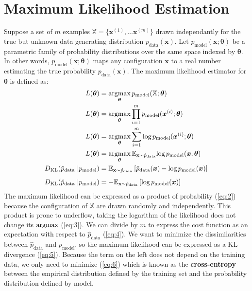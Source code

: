 \documentclass[12pt]{report}
\newcommand{\argmax}{\operatornamewithlimits{argmax}}
\begin{document}
        \section{Maximum Likelihood Estimation}
            Suppose a set of $m$ examples $\mathbb{X} = \{\boldsymbol{x}^{(1)}, \dots \boldsymbol{x}^{(m)}\}$ drawn independantly for the true but unknown data generating distribution $p_{\text{data}}(\boldsymbol{x})$.
            Let $p_{\text{model}}(\boldsymbol{\mathbf{x}};\boldsymbol{\theta})$ be a parametric family of probability distributions over the same space indexed by $\boldsymbol{\theta}$. In other words, $p_{\text{model}}(\boldsymbol{x};\boldsymbol{\theta})$ maps any configuration $\boldsymbol{x}$ to a real number estimating the true probability $p_{\text{data}}(\boldsymbol{x})$. The maximum likelihood estimator for $\boldsymbol{\theta}$ is defined as:
            \begin{align}
                L(\boldsymbol{\theta}) &= \argmax_{\boldsymbol{\theta}}p_{\text{model}}(\mathbb{X};\boldsymbol{\theta}) \label{eq:1}\\
                L(\boldsymbol{\theta}) &= \argmax_{\boldsymbol{\theta}}\prod_{i=1}^{m}{p_{\text{model}}(\boldsymbol{x}^{(i)};\boldsymbol{\theta})} \label{eq:2}\\
                L(\boldsymbol{\theta}) &= \argmax_{\boldsymbol{\theta}}\sum_{i=1}^{m}{\text{log}\,p_{\text{model}}(\boldsymbol{x}^{(i)};\boldsymbol{\theta})} \label{eq:3}\\
                L(\boldsymbol{\theta}) &= \argmax_{\boldsymbol{\theta}}\mathbb{E}_{\mathbf{x}\sim \hat{p}_{\text{data}}}\text{log}\,p_{\text{model}}(\boldsymbol{x};\boldsymbol{\theta}) \label{eq:4}\\
                D_{\text{KL}}(\hat{p}_{\text{data}}||p_{\text{model}}) &= \mathbb{E}_{\mathbf{x}\sim \hat{p}_{\text{data}}}\left[\hat{p}_{\text{data}}(\boldsymbol{x}) - \text{log}\,p_{\text{model}}(\boldsymbol{x})\right] \label{eq:5} \\[5pt]
                D_{\text{KL}}(\hat{p}_{\text{data}}||p_{\text{model}}) &= -\mathbb{E}_{\mathbf{x}\sim \hat{p}_{\text{data}}}\left[\text{log}\,p_{\text{model}}(\boldsymbol{x})\right] \label{eq:6}
            \end{align}
            The maximum likelihood can be expressed as a product of probability (\ref{eq:2}) because the configuration of $\mathbb{X}$ are drawn randomly and independently. This product is prone to underflow, taking the logarithm of the likelihood does not change its $\argmax$ (\ref{eq:3}). We can divide by $m$ to express the cost function as an expectation with respect to $\hat{p}_{\text{data}}$ (\ref{eq:4}). We want to minimize the dissimilarities between $\hat{p}_{\text{data}}$ and $p_{\text{model}}$, so the maximum likelihood can be expressed as a KL divergence (\ref{eq:5}). Because the term on the left does not depend on the training data, we only need to minimize (\ref{eq:6}) which is known as the \textbf{cross-entropy} between the empirical distribution defined by the training set and the probability distribution defined by model.
            
\end{document}
